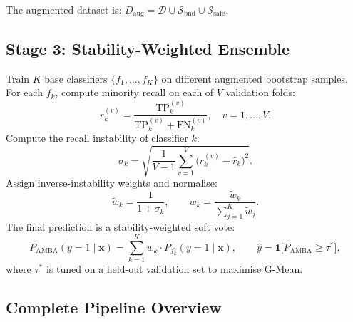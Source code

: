 \documentclass[11pt,a4paper]{article}
\newcommand{\Daug}{D_{\mathrm{aug}}}
\begin{document}
The augmented dataset is: $\Daug = \mathcal{D} \cup \mathcal{S}_{\mathrm{bnd}} \cup \mathcal{S}_{\mathrm{safe}}$.

\subsection{Stage 3: Stability-Weighted Ensemble}

Train $K$ base classifiers $\{f_1, \ldots, f_K\}$ on different augmented bootstrap samples.
For each $f_k$, compute minority recall on each of $V$ validation folds:
\[
  r_k^{(v)} = \frac{\mathrm{TP}_k^{(v)}}{\mathrm{TP}_k^{(v)} + \mathrm{FN}_k^{(v)}},
  \quad v = 1, \ldots, V.
\]
Compute the recall instability of classifier $k$:
\[
  \sigma_k = \sqrt{\frac{1}{V-1}\sum_{v=1}^{V}\bigl(r_k^{(v)} - \bar{r}_k\bigr)^2}.
\]
Assign inverse-instability weights and normalise:
\[
  \tilde{w}_k = \frac{1}{1+\sigma_k}, \qquad
  w_k = \frac{\tilde{w}_k}{\sum_{j=1}^{K}\tilde{w}_j}.
\]
The final prediction is a stability-weighted soft vote:
\[
  P_{\mathrm{AMBA}}(y=1 \mid \mathbf{x}) = \sum_{k=1}^{K} w_k \cdot P_{f_k}(y=1 \mid \mathbf{x}),
  \qquad \hat{y} = \mathbf{1}\!\bigl[P_{\mathrm{AMBA}} \ge \tau^*\bigr],
\]
where $\tau^*$ is tuned on a held-out validation set to maximise G-Mean.

\subsection{Complete Pipeline Overview}
\end{document}
